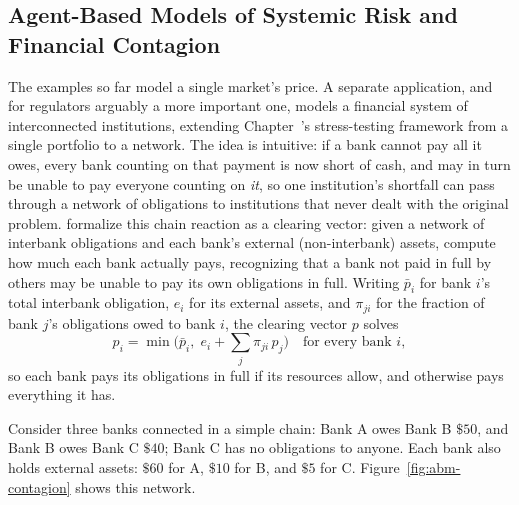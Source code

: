 \documentclass[../ai_in_finance]{subfiles}
\begin{document}
\subsection{Agent-Based Models of Systemic Risk and Financial Contagion}
\label{sec:abm-contagion}

The examples so far model a single market's price. A separate application, and for regulators arguably a more important one, models a financial system of interconnected institutions, extending Chapter~'s stress-testing framework from a single portfolio to a network. The idea is intuitive: if a bank cannot pay all it owes, every bank counting on that payment is now short of cash, and may in turn be unable to pay everyone counting on \emph{it}, so one institution's shortfall can pass through a network of obligations to institutions that never dealt with the original problem. \textcite{eisenberg2001systemic} formalize this chain reaction as a clearing vector: given a network of interbank obligations and each bank's external (non-interbank) assets, compute how much each bank actually pays, recognizing that a bank not paid in full by others may be unable to pay its own obligations in full. Writing $\bar p_i$ for bank $i$'s total interbank obligation, $e_i$ for its external assets, and $\pi_{ji}$ for the fraction of bank $j$'s obligations owed to bank $i$, the clearing vector $p$ solves
\begin{equation}
p_i = \min\Big(\bar p_i,\; e_i + \sum_j \pi_{ji}\, p_j\Big) \quad \text{for every bank } i,
\label{eq:abm-eisenberg-noe}
\end{equation}
so each bank pays its obligations in full if its resources allow, and otherwise pays everything it has.

\label{sec:abm-contagion-worked}

Consider three banks connected in a simple chain: Bank A owes Bank B $\$50$, and Bank B owes Bank C $\$40$; Bank C has no obligations to anyone. Each bank also holds external assets: $\$60$ for A, $\$10$ for B, and $\$5$ for C. Figure~\ref{fig:abm-contagion} shows this network.
\end{document}
